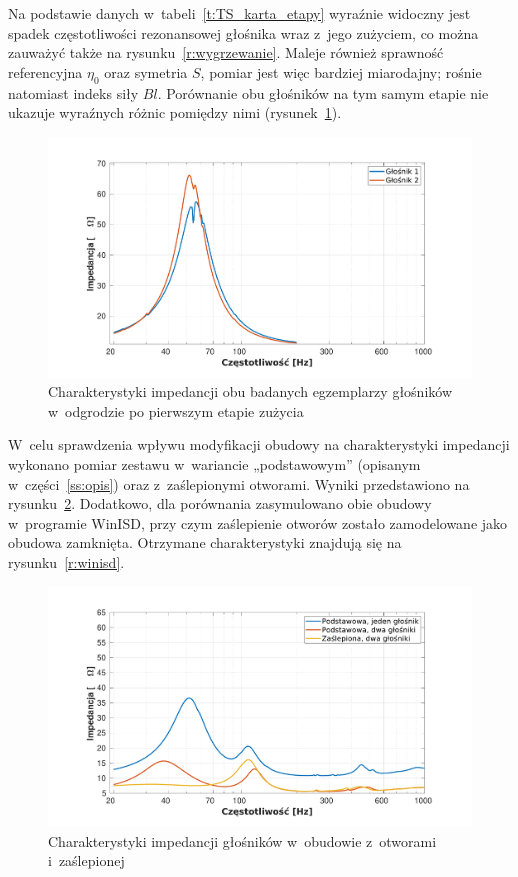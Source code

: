 \documentclass[12pt]{oska}
\begin{document}
	Na podstawie danych w~tabeli~\ref{t:TS_karta_etapy} wyraźnie widoczny jest spadek częstotliwości rezonansowej głośnika wraz z~jego zużyciem, co można zauważyć także na rysunku~\ref{r:wygrzewanie}. Maleje również sprawność referencyjna $\eta_0$ oraz symetria $S$, pomiar jest więc bardziej miarodajny; rośnie natomiast indeks siły $Bl$. Porównanie obu głośników na tym samym etapie nie ukazuje wyraźnych różnic pomiędzy nimi (rysunek~\ref{r:2glosniki}).
	
	\begin{figure}[!ht]
	\centering
	\includegraphics[width=.8\textwidth,trim={2cm .5cm 2cm 1cm},clip]{porownanie_glosnikow.pdf}
	\caption{Charakterystyki impedancji obu badanych egzemplarzy głośników w~odgrodzie po pierwszym etapie zużycia}
	\label{r:2glosniki}
	\end{figure}
	
	W~celu sprawdzenia wpływu modyfikacji obudowy na charakterystyki impedancji wykonano pomiar zestawu w~wariancie „podstawowym” (opisanym w~części~\ref{ss:opis}) oraz z~zaślepionymi otworami. Wyniki przedstawiono na rysunku~\ref{r:obudowa_otwory}. 
	Dodatkowo, dla porównania zasymulowano obie obudowy w~programie WinISD, przy czym zaślepienie otworów zostało zamodelowane jako obudowa zamknięta. Otrzymane charakterystyki znajdują się na rysunku~\ref{r:winisd}.
	
	\begin{figure}[!ht]
		\centering
		\includegraphics[width=.8\textwidth,trim={2cm .5cm 2cm 1cm},clip]{obudowa_otwory.pdf}
		\caption{Charakterystyki impedancji głośników w~obudowie z~otworami i~zaślepionej}
		\label{r:obudowa_otwory}
	\end{figure}
	
\end{document}
